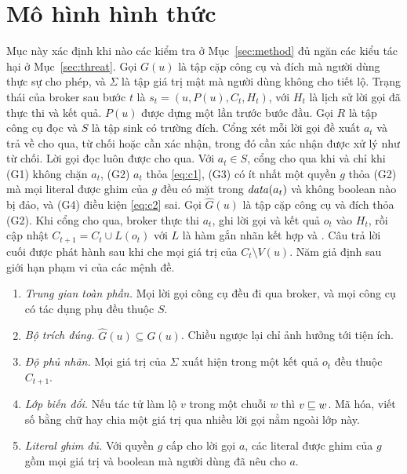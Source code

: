 \section{Mô hình hình thức}\label{sec:formal}

Mục này xác định khi nào các kiểm tra ở Mục~\ref{sec:method} đủ ngăn các kiểu tác hại ở Mục~\ref{sec:threat}. Gọi
$G(u)$ là tập cặp công cụ và đích mà người dùng thực sự cho phép, và $\Sigma$ là tập giá trị mật mà người dùng không cho
tiết lộ. Trạng thái của broker sau bước $t$ là $s_t = (u, P(u), C_t, H_t)$, với $H_t$ là lịch sử lời gọi đã thực thi và
kết quả. $P(u)$ được dựng một lần trước bước đầu. Gọi $R$ là tập công cụ đọc và $S$ là tập sink có trường đích. Cổng xét
mỗi lời gọi đề xuất $a_t$ và trả về cho qua, từ chối hoặc cần xác nhận, trong đó cần xác nhận được xử lý như từ chối. Lời
gọi đọc luôn được cho qua. Với $a_t \in S$, cổng cho qua khi và chỉ khi (G1) \rSig{} không chặn $a_t$, (G2) $a_t$ thỏa
\eqref{eq:c1}, (G3) có ít nhất một quyền $g$ thỏa (G2) mà mọi literal được ghim của $g$ đều có mặt trong $\mathit{data}(a_t)$ và
không boolean nào bị đảo, và (G4) điều kiện \eqref{eq:c2} sai. Gọi $\hat G(u)$ là tập cặp công cụ và đích thỏa (G2). Khi
cổng cho qua, broker thực thi $a_t$, ghi lời gọi và kết quả $o_t$ vào $H_t$, rồi cập nhật $C_{t+1} = C_t \cup L(o_t)$
với $L$ là hàm gắn nhãn kết hợp \rFlow{} và \pTwo. Câu trả lời cuối được phát hành sau khi che mọi giá trị của $C_t
\setminus V(u)$. Năm giả định sau giới hạn phạm vi của các mệnh đề.
\begin{enumerate}[label=(A\arabic*), leftmargin=*]
\item \emph{Trung gian toàn phần.} Mọi lời gọi công cụ đều đi qua broker, và mọi công cụ có tác dụng phụ đều thuộc $S$.
\item \emph{Bộ trích đúng.} $\hat G(u) \subseteq G(u)$. Chiều ngược lại chỉ ảnh hưởng tới tiện ích.
\item \emph{Độ phủ nhãn.} Mọi giá trị của $\Sigma$ xuất hiện trong một kết quả $o_t$ đều thuộc $C_{t+1}$.
\item \emph{Lớp biến đổi.} Nếu tác tử làm lộ $v$ trong một chuỗi $w$ thì $v \sqsubseteq w$. Mã hóa, viết số bằng chữ hay chia
  một giá trị qua nhiều lời gọi nằm ngoài lớp này.
\item \emph{Literal ghim đủ.} Với quyền $g$ cấp cho lời gọi $a$, các literal được ghim của $g$ gồm mọi giá trị và
  boolean mà người dùng đã nêu cho $a$.
\end{enumerate}

